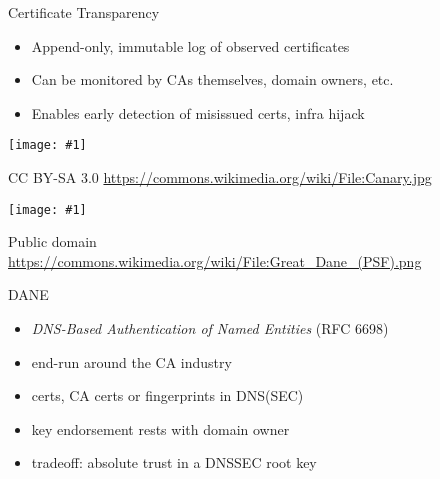 \documentclass[ignorenonframetext,aspectratio=169]{beamer}
\makeatletter
\def\maxwidth{\ifdim\Gin@nat@width>\linewidth\linewidth\else\Gin@nat@width\fi}
\def\maxheight{\ifdim\Gin@nat@height>\textheight0.8\textheight\else\Gin@nat@height\fi}
\newcommand{\includegraphicsscaled}[1]{
    \texttt{[image: \#1]}
}
\makeatother
\begin{document}
\begin{frame}{Certificate Transparency}

\begin{itemize}
\item
  Append-only, immutable log of observed certificates
\item
  Can be monitored by CAs themselves, domain owners, etc.
\item
  Enables early detection of misissued certs, infra hijack
\end{itemize}

\end{frame}

\begin{frame}[plain]

\begin{center}
\includegraphicsscaled{Canary.jpg}
\end{center}

\tiny

CC BY-SA 3.0 \url{https://commons.wikimedia.org/wiki/File:Canary.jpg}

\end{frame}

\begin{frame}[plain]

\begin{center}
\includegraphicsscaled{Great_Dane_(PSF).png}
\end{center}

\tiny

Public domain \url{https://commons.wikimedia.org/wiki/File:Great_Dane_(PSF).png}

\end{frame}

\begin{frame}{DANE}

\begin{itemize}
\item
  \emph{DNS-Based Authentication of Named Entities} (RFC 6698)
\item
  end-run around the CA industry
\item
  certs, CA certs or fingerprints in DNS(SEC)
\item
  key endorsement rests with domain owner
\item
  tradeoff: absolute trust in a DNSSEC root key
\end{itemize}

\end{frame}
\end{document}

